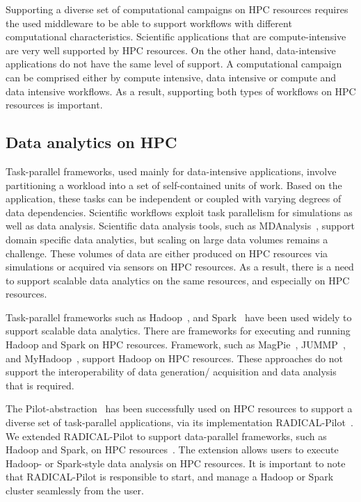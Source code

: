 \label{current_research}
Supporting a diverse set of computational campaigns on HPC resources requires the used middleware to be able to support workflows with different computational characteristics.
Scientific applications that are compute-intensive are very well supported by HPC resources.
On the other hand, data-intensive applications do not have the same level of support.
A computational campaign can be comprised either by compute intensive, data intensive or compute and data intensive workflows.
As a result, supporting both types of workflows on HPC resources is important.

\subsection{Data analytics on HPC}
\label{data_analysis_hpc}
Task-parallel frameworks, used mainly for data-intensive applications, involve partitioning a workload into a set of self-contained units of work. 
Based on the application, these tasks can be independent or coupled with varying degrees of data dependencies. 
Scientific workflows exploit task parallelism for simulations as well as data analysis.
Scientific data analysis tools, such as MDAnalysis~\cite{gowers2016mdanalysis,michaud2011mdanalysis}, support domain specific data analytics, but scaling on large data volumes remains a challenge.
These volumes of data are either produced on HPC resources via simulations or acquired via sensors on HPC resources.
As a result, there is a need to support scalable data analytics on the same resources, and especially on HPC resources.

Task-parallel frameworks such as Hadoop~\cite{hadoop}, and Spark~\cite{zaharia2010spark} have been used widely to support scalable data analytics.
There are frameworks for executing and running Hadoop and Spark on HPC resources.
Framework, such as MagPie~\cite{magpie}, JUMMP~\cite{moody2013jummp}, and MyHadoop~\cite{krishnan04myhadoop}, support Hadoop on HPC resources.
These approaches do not support the interoperability of data generation/ acquisition and data analysis that is required.

The Pilot-abstraction~\cite{luckow2012pstar} has been successfully used on HPC resources to support a diverse set of task-parallel applications, via its implementation RADICAL-Pilot~\cite{merzky2019using}.
We extended RADICAL-Pilot to support data-parallel frameworks, such as Hadoop and Spark, on HPC resources~\cite{luckow2016hadoop}.
The extension allows users to execute Hadoop- or Spark-style data analysis on HPC resources.
It is important to note that RADICAL-Pilot is responsible to start, and manage a Hadoop or Spark cluster seamlessly from the user.

